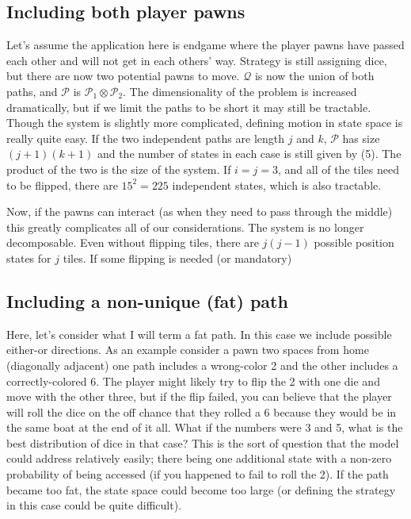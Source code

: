 \documentclass[letterpaper,11pt]{article}
\begin{document}
\subsection{Including both player pawns}
Let's assume the application here is endgame where the player pawns have
passed each other and will not get in each others' way.  Strategy is still
assigning dice, but there are now two potential pawns to move.  $\mathcal{Q}$ 
is now the union of both paths, and $\mathcal{P}$ is $\mathcal{P}_1\otimes
\mathcal{P}_2$.  The dimensionality of the problem is increased dramatically,
but if we limit the paths to be short it may still be tractable.  Though the
system is slightly more complicated, defining motion in state space is really
quite easy.  If the two independent paths are length $j$ and $k$, $\mathcal{P}$
has size $(j+1)(k+1)$ and the number of states in each case is still given by
(5).  The product of the two is the size of the system.  If $i=j=3$, and all of
the tiles need to be flipped, there are $15^2=225$ independent states, which is
also tractable.

Now, if the pawns can interact (as when they need to pass through the middle)
this greatly complicates all of our considerations.  The system is no longer
decomposable.  Even without flipping tiles, there are $j(j-1)$ possible
position states for $j$ tiles.  If some flipping is needed (or mandatory)

\subsection{Including a non-unique (fat) path}
Here, let's consider what I will term a fat path.  In this case we include
possible either-or directions.  As an example consider a pawn two spaces from
home (diagonally adjacent) one path includes a wrong-color 2 and the other
includes a correctly-colored 6.  The player might likely try to flip the 2 with
one die and move with the other three, but if the flip failed, you can believe
that the player will roll the dice on the off chance that they rolled a 6
because they would be in the same boat at the end of it all.  What if the
numbers were 3 and 5, what is the best distribution of dice in that case?
This is the sort of question that the model could address relatively easily;
there being one additional state with a non-zero probability of being accessed
(if you happened to fail to roll the 2).  If the path became too fat, the state
space could become too large (or defining the strategy in this case could be
quite difficult).
\end{document}
